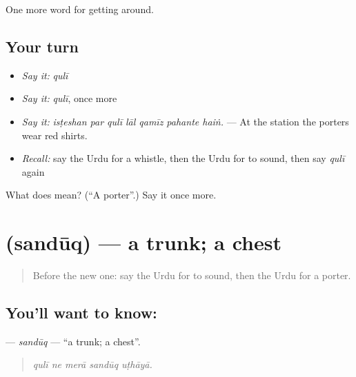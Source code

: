\begin{grammarlens}[title={What you've built}]
One more word for getting around.
\end{grammarlens}

\subsection*{Your turn}
\begin{itemize}
\raggedright
  \item \emph{Say it:} \emph{qulī}
  \item \emph{Say it:} \emph{qulī}, once more
  \item \emph{Say it:} \emph{isṭeshan par qulī lāl qamīz pahante haiṅ.} — At the station the porters wear red shirts.
  \item \emph{Recall:} say the Urdu for a whistle, then the Urdu for to sound, then say \emph{qulī} again
\end{itemize}

\begin{tcolorbox}[breakable,colback=teal!4,colframe=teal!35!black,title={Before you move on}]
What does  mean? (\textquotedblleft{}A porter\textquotedblright{}.) Say it once more.
\end{tcolorbox}
\section[\texorpdfstring{\ur{صندوق} (sandūq)}{صندوق (sandūq)}]{ (sandūq) — a trunk; a chest}

\label{lesson:UR-C387-sanduq}



\begin{quote}
Before the new one: say the Urdu for to sound, then the Urdu for a porter.
\end{quote}

\subsection*{You'll want to know: }
\textbf{} — \emph{sandūq} — \textquotedblleft{}a trunk; a chest\textquotedblright{}.

\begin{quote}
    
\end{quote}

\begin{quote}
\emph{qulī ne merā sandūq uṭhāyā.}
\end{quote}

